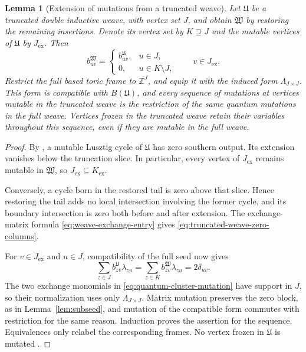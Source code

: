 \documentclass[12pt, reqno]{amsart}
\theoremstyle{plain}
\newtheorem{lemma}[theorem]{Lemma}
\theoremstyle{definition}
\numberwithin{equation}{section}
\newcommand{\ZZ}{\mathbb{Z}}
\begin{document}
\begin{lemma}[Extension of mutations from a truncated weave]
\label{lem:quantum-truncated-weave-extension}
Let \(\mathfrak U\) be a truncated double inductive weave, with
vertex set \(J\), and obtain \(\mathfrak W\) by restoring the
remaining insertions. Denote its vertex set by \(K\supseteq J\)
and the mutable vertices of \(\mathfrak U\) by \(J_{\mathrm{ex}}\).
Then
\begin{equation}\label{eq:truncated-weave-zero-columns}
 b^{\mathfrak W}_{uv}=
 \begin{cases}
 b^{\mathfrak U}_{uv},&u\in J,\\
 0,&u\in K\setminus J,
 \end{cases}
 \qquad v\in J_{\mathrm{ex}}.
\end{equation}
Restrict the full based toric frame to \(\ZZ^J\), and equip it
with the induced form \(\Lambda_{J\times J}\). This form is
compatible with \(B(\mathfrak U)\), and every sequence of
mutations at vertices mutable in the truncated weave is the
restriction of the same quantum mutations in the full weave.
Vertices frozen in the truncated weave retain their variables
throughout this sequence, even if they are mutable in the full weave.
\end{lemma}

\begin{proof}
By \cite[Definition~4.35]{casals2025cluster}, a mutable Lusztig
cycle of \(\mathfrak U\) has zero southern output. Its extension
vanishes below the truncation slice. In particular, every
vertex of \(J_{\mathrm{ex}}\) remains mutable in \(\mathfrak W\),
so \(J_{\mathrm{ex}}\subseteq K_{\mathrm{ex}}\).

Conversely, a cycle born
in the restored tail is zero above that slice. Hence restoring the
tail adds no local intersection involving the former cycle, and
its boundary intersection is zero both before and after extension.
The exchange-matrix formula \eqref{eq:weave-exchange-entry} gives
\eqref{eq:truncated-weave-zero-columns}.

For \(v\in J_{\mathrm{ex}}\) and \(u\in J\), compatibility of
the full seed now gives
\[
 \sum_{z\in J}b^{\mathfrak U}_{zv}\lambda_{zu}
 =\sum_{z\in K}b^{\mathfrak W}_{zv}\lambda_{zu}
 =2\delta_{uv}.
\]
The two exchange monomials in
\eqref{eq:quantum-cluster-mutation} have support in \(J\), so
their normalization uses only \(\Lambda_{J\times J}\).
Matrix mutation preserves the zero block, as in
Lemma~\ref{lem:subseed}, and mutation of the compatible form
commutes with restriction for the same reason. Induction proves
the assertion for the sequence. Equivalences only relabel the
corresponding frames. No vertex frozen in \(\mathfrak U\) is
mutated \cite[Lemmas~4.36--4.37]{casals2025cluster}.
\end{proof}
\end{document}
